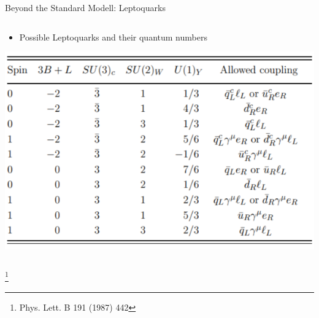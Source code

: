 \begin{frame}{Beyond the Standard Modell: Leptoquarks}
\begin{columns}
\begin{column}{0.45\textwidth}
\begin{itemize}
                \item [] Possible Leptoquarks and their quantum numbers\footnotemark
            \end{itemize}
            \includegraphics[scale=0.32]{content/images/LQ-Table.PNG}
        \end{column}
    \end{columns}
    \footnote[11]{Phys. Lett. B 191 (1987) 442}
\end{frame}

